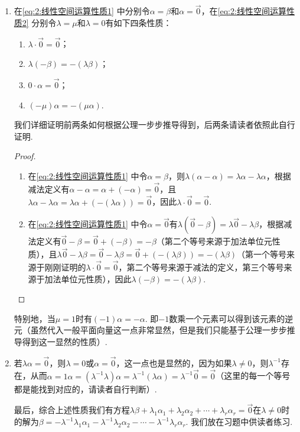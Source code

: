 \begin{enumerate}
\begin{enumerate}
        \item 在\autoref{eq:2:线性空间运算性质1} 中分别令$\alpha=\beta$和$\alpha=\vec{0}$，在\autoref{eq:2:线性空间运算性质2} 分别令$\lambda=\mu$和$\lambda=0$有如下四条性质：
        \begin{enumerate}
            \item $\lambda\cdot \vec{0}=\vec{0}$；

            \item $\lambda(-\beta)=-(\lambda\beta)$；

            \item $0\cdot \alpha=\vec{0}$；

            \item $(-\mu)\alpha=-(\mu\alpha)$.
        \end{enumerate}
        我们详细证明前两条如何根据公理一步步推导得到，后两条请读者依照此自行证明.
        \begin{proof}
            \begin{enumerate}
                \item 在\autoref{eq:2:线性空间运算性质1} 中令$\alpha=\beta$，则$\lambda(\alpha-\alpha)=\lambda\alpha-\lambda\alpha$，根据减法定义有$\alpha-\alpha=\alpha+(-\alpha)=\vec{0}$，且$\lambda\alpha-\lambda\alpha=\lambda\alpha+(-(\lambda\alpha))=\vec{0}$，因此$\lambda\cdot \vec{0}=\vec{0}$.

                \item 在\autoref{eq:2:线性空间运算性质1} 中令$\alpha=\vec{0}$有$\lambda(\vec{0}-\beta)=\lambda\vec{0}-\lambda\beta$，根据减法定义有$\vec{0}-\beta=\vec{0}+(-\beta)=-\beta$（第二个等号来源于加法单位元性质），且$\lambda\vec{0}-\lambda\beta=\vec{0}-\lambda\beta=\vec{0}+(-(\lambda\beta))=-(\lambda\beta)$（第一个等号来源于刚刚证明的$\lambda\cdot \vec{0}=\vec{0}$，第二个等号来源于减法的定义，第三个等号来源于加法单位元性质），因此$\lambda(-\beta)=-(\lambda\beta)$.
            \end{enumerate}
        \end{proof}
        特别地，当$\mu=1$时有$(-1)\alpha=-\alpha$. 即$-1$数乘一个元素可以得到该元素的逆元（虽然代入一般平面向量这一点非常显然，但是我们只能基于公理一步步推导得到这一显然的性质）.

        \item 若$\lambda\alpha=\vec{0}$，则$\lambda=0$或$\alpha=\vec{0}$，这一点也是显然的，因为如果$\lambda\neq 0$，则$\lambda^{-1}$存在，从而$\alpha=1\alpha=(\lambda^{-1}\lambda)\alpha=\lambda^{-1}(\lambda\alpha)=\lambda^{-1}\vec{0}=\vec{0}$（这里的每一个等号都是能找到对应的，请读者自行判断）.

        最后，综合上述性质我们有方程$\lambda\beta+\lambda_1\alpha_1+\lambda_2\alpha_2+\cdots+\lambda_r\alpha_r=\vec{0}$在$\lambda\neq 0$时的解为$\beta=-\lambda^{-1}\lambda_1\alpha_1-\lambda^{-1}\lambda_2\alpha_2-\cdots-\lambda^{-1}\lambda_r\alpha_r$. 我们放在习题中供读者练习.
    \end{enumerate}
\end{enumerate}

